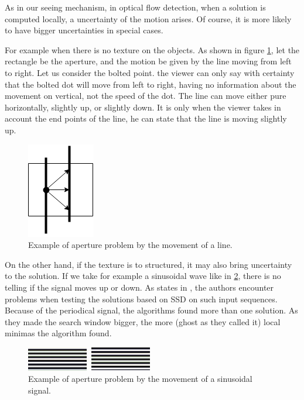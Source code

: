 \documentclass[12pt,a4paper,twoside]{report}
\begin{document}
{ 
As in our seeing mechanism, in optical flow detection, when a solution is computed locally, a uncertainty of the motion arises. Of course, it is more likely to have bigger uncertainties in special cases. 

For example when there is no texture on the objects. As shown in figure \ref{apertureimg}, let the rectangle be the aperture, and the motion be given by the line moving from left to right. Let us consider the bolted point. the viewer can only say with certainty that the bolted dot will move from left to right, having no information about the movement on vertical, not the speed of the dot. The line can move either pure horizontally, slightly up, or slightly down. It is only when the viewer takes in account the end points of the line, he can state that the line is moving slightly up.  

\begin{figure}
	\label{apertureimg}
	\centering
	\includegraphics{img/Aperture}
	\caption{Example of aperture problem by the movement of a line.}
\end{figure}

On the other hand, if the texture is to structured, it may also bring uncertainty to the solution. If we take for example a sinusoidal wave like in \ref{apertureimgSin}, there is no telling if the signal moves up or down. As states in \cite{barron1994}, the authors encounter problems when testing the solutions based on SSD on such input sequences. Because of the periodical signal, the algorithms found more than one solution. As they made the search window bigger, the more (ghost as they called it) local minimas the algorithm found. 

\begin{figure}
	\label{apertureimgSin}
	\centering
	\includegraphics{img/sin}
	\caption{Example of aperture problem by the movement of a sinusoidal signal.}
\end{figure}


}
\end{document}
